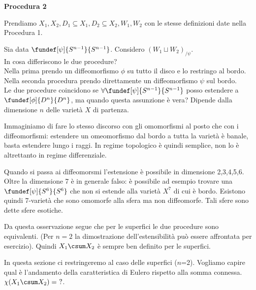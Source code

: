 \textbf{Procedura 2}

Prendiamo $X_1, X_2, D_1 \subseteq X_1, D_2 \subseteq X_2, W_1, W_2$ con le stesse definizioni date nella Procedura 1.

Sia data $\fundef[\psi]{S^{n-1}}{S^{n-1}}$. Considero $(W_1 \sqcup W_2)_{/\psi}$.
\\

In cosa differiscono le due procedure?\\
Nella prima prendo un diffeomorfismo $\phi$ su tutto il disco e lo restringo al bordo. Nella seconda procedura prendo direttamente un diffeomorfismo $\psi$ sul bordo.\\
Le due procedure coincidono se $\forall \fundef[\psi]{S^{n-1}}{S^{n-1}}$ posso estendere a $\fundef[\phi ]{D^n}{D^n}$, ma quando questa assunzione è vera? Dipende dalla dimensione $n$ delle varietà $X$ di partenza.

\begin{oss}
Immaginiamo di fare lo stesso discorso con gli omomorfismi al posto che con i diffeomorfismi: estendere un omeomorfismo dal bordo a tutta la varietà è banale, basta estendere lungo i raggi.
In regime topologico è quindi semplice, non lo è altrettanto in regime differenziale.

Quando si passa ai diffeomorsmi l'estensione è possibile in dimensione 2,3,4,5,6. Oltre la dimensione 7 è in generale falso: è possibile ad esempio trovare una $\fundef[\psi]{S^6}{S^6}$ che non si estende alla varietà $X^7$ di cui è bordo. Esistono quindi 7-varietà che sono omomorfe alla sfera ma non diffeomorfe. Tali sfere sono dette sfere esotiche.
\end{oss}

Da questa osservazione segue che per le superfici le due procedure sono equivalenti. (Per $n=2$ la dimostrazione dell'estensibilità può essere affrontata per esercizio). Quindi $X_1 \csum X_2$ è sempre ben definito per le superfici.

\begin{epigraphs}	
\end{epigraphs}


In questa sezione ci restringeremo al caso delle superfici ($n$=2). Vogliamo capire qual è l'andamento della caratteristica di Eulero rispetto alla somma connessa. $\chi(X_1 \csum X_2) =~?$.

